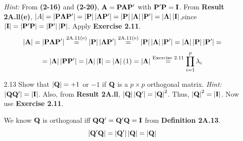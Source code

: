 \begin{enumerate}[font=\bfseries]
        \newline
        \textit{Hint:} From \textbf{(2-16)} and \textbf{(2-20)}, $\bold{A} =\bold{P}\bold{A}\bold{P}^\prime$ with $\bold{P}^\prime\bold{P} =\bold{I}$. From \textbf{Result 2A.ll(e)},
        $\left|A\right| = \left|\bold{P}\bold{\Lambda}\bold{P}^\prime\right| = \left|\bold{P}\right| \left|\bold{\Lambda}\bold{P}^\prime\right| = \left|\bold{P}\right| \left|\bold{\Lambda}\right| \left|\bold{P}^\prime\right| = \left|\bold{\Lambda}\right| \left|\bold{I}\right|$,since $\left|\bold{I}\right| = \left|\bold{P}^\prime\bold{P}\right| = \left|\bold{P}^\prime\right| \left|\bold{P}\right|$. Apply
        \textbf{Exercise 2.11}.
        \[
            \left|\bold{A}\right|
            = 
            \left|\bold{P}\bold{\Lambda}\bold{P}^\prime\right|
            \overset{\text{2A.11(e)}}{=} 
            \left|\bold{P}\right|\left|\bold{\Lambda}\bold{P}^\prime\right| \overset{\text{2A.11(e)}}{=} 
            \left|\bold{P}\right|\left|\bold{\Lambda}\right|\left|\bold{P}^\prime\right| 
            = 
            \left|\bold{\Lambda}\right|\left|\bold{P}\right|\left|\bold{P}^\prime\right| 
            =
        \]
        \[
            =
            \left|\bold{\Lambda}\right|\left|\bold{P}\bold{P}^\prime\right|
            =
            \left|\bold{\Lambda}\right|\left|\bold{I}\right|
            =
            \left|\bold{\Lambda}\right|(1)
            =
            \left|\bold{\Lambda}\right|
            \overset{\text{Exercise 2.11}}{=}
            \prod_{i=1}^p{\lambda_i}
        \]
        \item[2.13] Show that $\left|\bold{Q}\right| = +1$ or $- 1$ if $\bold{Q}$ is a $p \times p$ orthogonal matrix.
        \newline
        \textit{Hint:} $\left|\bold{Q}\bold{Q}^\prime\right| = \left|\bold{I}\right|$. Also, from \textbf{Result 2A.ll}, $\left|\bold{Q}\right| \left|\bold{Q}^\prime\right| = \left|\bold{Q}\right|^2$. Thus, $\left|\bold{Q}\right|^2 = \left|\bold{I}\right|$. Now use \textbf{Exercise 2.11}.
        \par
        We know $\bold{Q}$ is orthogonal iff $\bold{Q}\bold{Q}^\prime = \bold{Q}^\prime\bold{Q} = \bold{I}$ from \textbf{Definition 2A.13}.
        \[
            \left|\bold{Q}^\prime\bold{Q}\right| 
            =
            \left|\bold{Q}^\prime\right|
            \left|\bold{Q}\right|
            =
            \left|\bold{Q}\right|
\]
\end{enumerate}
